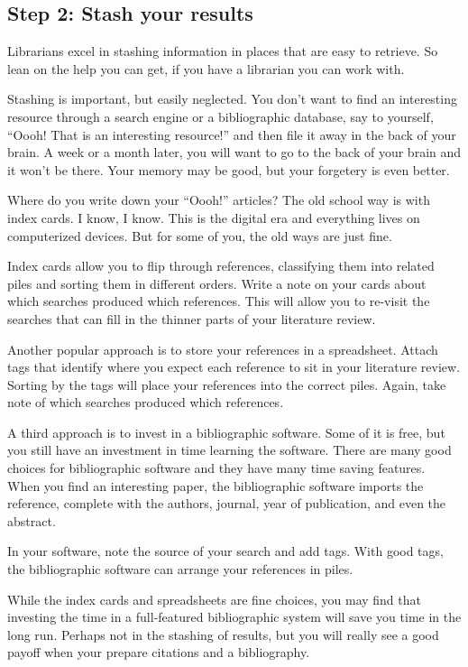 \documentclass[
  letterpaper,
  DIV=11,
  numbers=noendperiod]{scrreprt}
\begin{document}
\begin{tcolorbox}
\section{Step 2: Stash your results}\label{step-2-stash-your-results}

Librarians excel in stashing information in places that are easy to
retrieve. So lean on the help you can get, if you have a librarian you
can work with.

Stashing is important, but easily neglected. You don't want to find an
interesting resource through a search engine or a bibliographic
database, say to yourself, ``Oooh! That is an interesting resource!''
and then file it away in the back of your brain. A week or a month
later, you will want to go to the back of your brain and it won't be
there. Your memory may be good, but your forgetery is even better.

Where do you write down your ``Oooh!'' articles? The old school way is
with index cards. I know, I know. This is the digital era and everything
lives on computerized devices. But for some of you, the old ways are
just fine.

Index cards allow you to flip through references, classifying them into
related piles and sorting them in different orders. Write a note on your
cards about which searches produced which references. This will allow
you to re-visit the searches that can fill in the thinner parts of your
literature review.

Another popular approach is to store your references in a spreadsheet.
Attach tags that identify where you expect each reference to sit in your
literature review. Sorting by the tags will place your references into
the correct piles. Again, take note of which searches produced which
references.

A third approach is to invest in a bibliographic software. Some of it is
free, but you still have an investment in time learning the software.
There are many good choices for bibliographic software and they have
many time saving features. When you find an interesting paper, the
bibliographic software imports the reference, complete with the authors,
journal, year of publication, and even the abstract.

In your software, note the source of your search and add tags. With good
tags, the bibliographic software can arrange your references in piles.

While the index cards and spreadsheets are fine choices, you may find
that investing the time in a full-featured bibliographic system will
save you time in the long run. Perhaps not in the stashing of results,
but you will really see a good payoff when your prepare citations and a
bibliography.


\end{tcolorbox}
\end{document}
